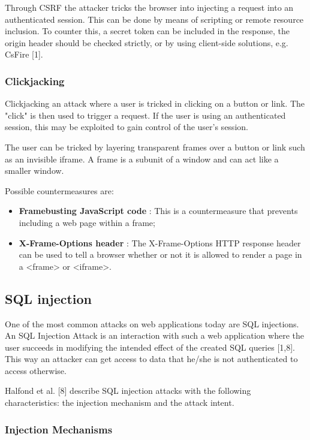 Through CSRF the attacker tricks the browser into injecting a request into an authenticated session. This can be done by means of scripting or remote resource inclusion. To counter this, a secret token can be included in the response, the origin header should be checked strictly, or by using client-side solutions, e.g. CsFire [1].


\subsubsection{Clickjacking}

Clickjacking an attack where a user is tricked in clicking on a button or link. The "click" is then used to trigger a request. If the user is using an authenticated session, this may be exploited to gain control of the user's session.

The user can be tricked by layering transparent frames over a button or link such as an invisible iframe. A frame is a subunit of a window and can act like a smaller window.

Possible countermeasures are:
\begin{itemize}
	\item \textbf{Framebusting JavaScript code} : This is a countermeasure that prevents including a web page within a frame;
	\item \textbf{X-Frame-Options header} : The X-Frame-Options HTTP response header can be used to tell a browser whether or not it is allowed to render a page in a <frame> or <iframe>.
\end{itemize}


\subsection{SQL injection}

One of the most common attacks on web applications today are SQL injections. An SQL Injection Attack is an interaction with such a web application where the user succeeds in modifying the intended effect of the created SQL queries [1,8]. This way an attacker can get access to data that he/she is not authenticated to access otherwise.

Halfond et al. [8] describe SQL injection attacks with the following characteristics: the injection mechanism and the attack intent.


\subsubsection{Injection Mechanisms}

